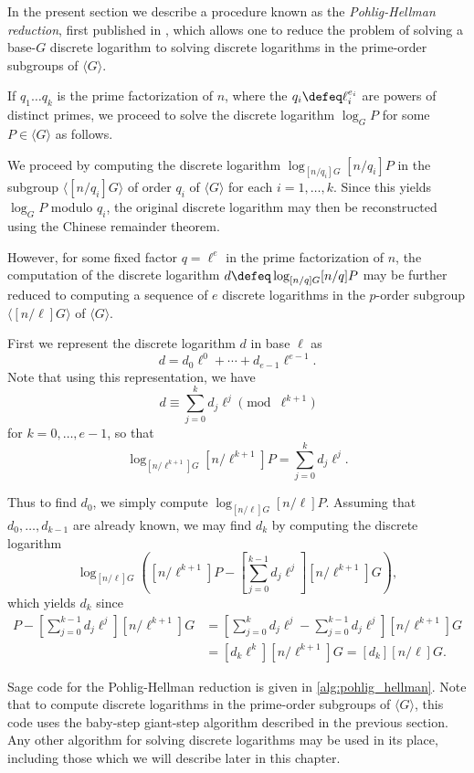 In the present section we describe a procedure known as the \emph{Pohlig-Hellman reduction}, first published in \citep{Pohlig}, which allows one to reduce the problem of solving a base-$G$ discrete logarithm to solving discrete logarithms in the prime-order subgroups of $\langle G \rangle$.

If $q_1 \ldots q_k$ is the prime factorization of $n$, where the $q_i \defeq \ell_i^{e_i}$ are powers of distinct primes, we proceed to solve the discrete logarithm $\log_G P$ for some $P \in \langle G \rangle$ as follows.

We proceed by computing the discrete logarithm $\log_{[n / q_i] G} [n / q_i] P$ in the subgroup $\langle [n / q_i] G \rangle$ of order $q_i$ of $\langle G \rangle$ for each $i = 1, \ldots, k$. Since this yields $\log_G P$ modulo $q_i$, the original discrete logarithm may then be reconstructed using the Chinese remainder theorem.

However, for some fixed factor $q = \ell^e$ in the prime factorization of $n$, the computation of the discrete logarithm $d \defeq \log_{[n / q] G} [n / q] P$ may be further reduced to computing a sequence of $e$ discrete logarithms in the $p$-order subgroup $\langle [n / \ell] G \rangle$ of $\langle G \rangle$.

First we represent the discrete logarithm $d$ in base $\ell$ as
\[
d = d_0 \ell^0 + \cdots + d_{e-1} \ell^{e-1}.
\]
Note that using this representation, we have \[d \equiv \sum_{j=0}^k d_j \ell^j \pmod{\ell^{k + 1}}\] for $k = 0, \ldots, e-1$, so that
\[
\log_{[n / \ell^{k+1}] G} [n / \ell^{k+1}] P = \sum_{j=0}^k d_j \ell^j.
\]

Thus to find $d_0$, we simply compute $\log_{[n / \ell] G} [n / \ell] P$. Assuming that $d_0, \ldots, d_{k-1}$ are already known, we may find $d_k$ by computing the discrete logarithm
\[
\log_{[n / \ell] G} \left( [n / \ell^{k+1}] P - \left[\sum_{j=0}^{k-1} d_j \ell^j\right] [n / \ell^{k+1}] G \right),
\]
which yields $d_k$ since
\begin{align*}
[n / \ell^{k+1}] P - \left[\sum_{j=0}^{k-1} d_j \ell^j\right] [n / \ell^{k+1}] G &= \left[\sum_{j=0}^{k} d_j \ell^j - \sum_{j=0}^{k-1} d_j \ell^j\right] [n / \ell^{k+1}] G \\
&= [d_k \ell^k] [n / \ell^{k+1}] G = [d_k] [n / \ell] G.
\end{align*}

Sage code for the Pohlig-Hellman reduction is given in \cref{alg:pohlig_hellman}. Note that to compute discrete logarithms in the prime-order subgroups of $\langle G \rangle$, this code uses the baby-step giant-step algorithm described in the previous section. Any other algorithm for solving discrete logarithms may be used in its place, including those which we will describe later in this chapter.

